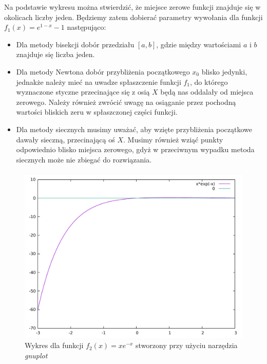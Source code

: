 \documentclass[a4paper]{article}
\begin{document}
Na podstawie wykresu można stwierdzić, że miejsce zerowe funkcji znajduje się w okolicach liczby jeden. Będziemy zatem dobierać parametry wywołania dla funkcji $f_{1}(x) = e^{1 - x} - 1$ następująco:

\begin{center}
\begin{itemize}
\item Dla metody bisekcji dobór przedziału $[a, b]$, gdzie między wartościami $a$ i $b$ znajduje się liczba jeden.
\item Dla metody Newtona dobór przybliżenia początkowego $x_{0}$ blisko jedynki, jednakże należy mieć na uwadze spłaszczenie funkcji $f_{1}$, do którego wyznaczone styczne przecinające się z osią $X$ będą nas oddalały od miejsca zerowego. Należy również zwrócić uwagę na osiąganie przez pochodną wartości bliskich zeru w spłaszczonej części funkcji.
\item Dla metody siecznych musimy uważać, aby wzięte przybliżenia początkowe dawały sieczną, przecinającą oś $X$. Musimy również wziąć punkty odpowiednio blisko miejsca zerowego, gdyż w przeciwnym wypadku metoda siecznych może nie zbiegać do rozwiązania.
\end{itemize}
\end{center}

\paragraph{}
\begin{figure}[htbp]
  \centering
  \includegraphics[scale=0.35]{wykres6b.pdf}
  \caption{Wykres dla funkcji $f_{2}(x) = xe^{-x}$ stworzony przy użyciu narzędzia \textit{gnuplot}}
\end{figure}
\end{document}
